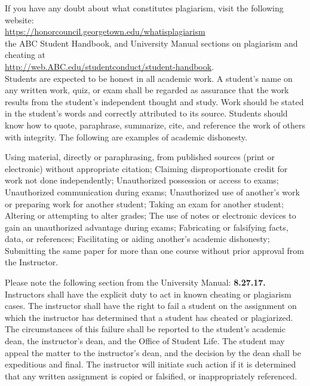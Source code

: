 If you have any doubt about what constitutes plagiarism, visit the following website:\\

 \url{https://honorcouncil.georgetown.edu/whatisplagiarism}\\
 
 the ABC Student Handbook, and University Manual sections on plagiarism and cheating at\\
 
\url{http://web.ABC.edu/studentconduct/student-handbook}.  \\


Students are expected to be honest in all academic work. A student’s name on any written work, quiz, or exam shall be regarded as assurance that the work results from the student’s independent thought and study. Work should be stated in the student’s words and correctly attributed to its source. Students should know how to quote, paraphrase, summarize, cite, and reference the work of others with integrity. The following are examples of academic dishonesty.
\begin{outline}
	\1	Using material, directly or paraphrasing, from published sources (print or electronic) without appropriate citation;
	\1	Claiming disproportionate credit for work not done independently;
	\1	Unauthorized possession or access to exams;
	\1	Unauthorized communication during exams;
	\1	Unauthorized use of another’s work or preparing work for another student;
	\1	Taking an exam for another student;
	\1	Altering or attempting to alter grades;
	\1	The use of notes or electronic devices to gain an unauthorized advantage during exams;
	\1	Fabricating or falsifying facts, data, or references;
	\1	Facilitating or aiding another’s academic dishonesty;
	\1	Submitting the same paper for more than one course without prior approval from the Instructor.
\end{outline}



Please note the following section from the University Manual:
\textbf{8.27.17.} Instructors shall have the explicit duty to act in known cheating or plagiarism cases. The instructor shall have the right to fail a student on the assignment on which the instructor has determined that a student has cheated or plagiarized. The circumstances of this failure shall be reported to the student’s academic dean, the instructor’s dean, and the Office of Student Life. The student may appeal the matter to the instructor’s dean, and the decision by the dean shall be expeditious and final.
The instructor will initiate such action if it is determined that any written assignment is copied or falsified, or inappropriately referenced.\\

